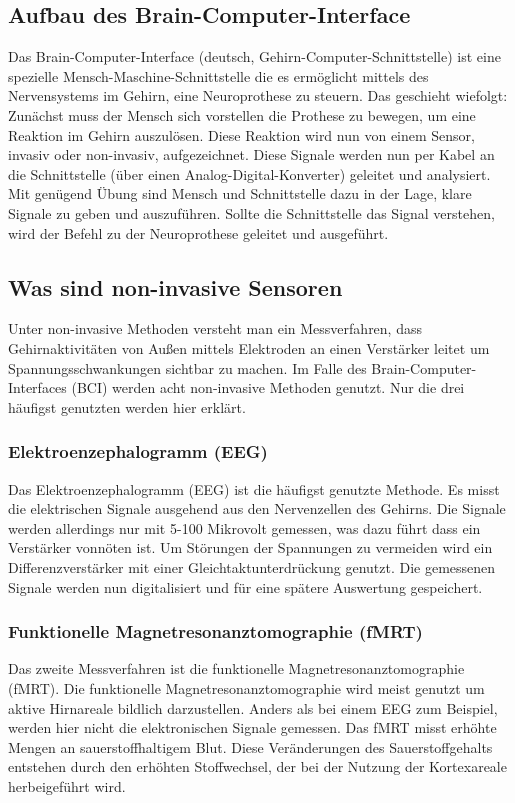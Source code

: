 \documentclass[11pt,ngerman,parskip=half]{scrartcl}
\begin{document}
\subsection{Aufbau des Brain-Computer-Interface} 
Das Brain-Computer-Interface (deutsch, Gehirn-Computer-Schnittstelle) ist
eine spezielle Mensch-Maschine-Schnittstelle die es ermöglicht mittels des
Nervensystems im Gehirn, eine Neuroprothese zu steuern. Das geschieht
wiefolgt: Zunächst muss der Mensch sich vorstellen die Prothese zu bewegen,
um eine Reaktion im Gehirn auszulösen. Diese Reaktion wird nun von einem
Sensor, invasiv oder non-invasiv, aufgezeichnet. Diese Signale werden nun per
Kabel an die Schnittstelle (über einen Analog-Digital-Konverter) geleitet und
analysiert. Mit genügend Übung sind Mensch und Schnittstelle dazu in der
Lage, klare Signale zu geben und auszuführen. Sollte die Schnittstelle das
Signal verstehen, wird der Befehl zu der Neuroprothese geleitet und
ausgeführt.
\parencites{uebersicht}{bciuinvasiv}

\subsection{Was sind non-invasive Sensoren}
Unter non-invasive Methoden versteht man ein Messverfahren, dass
Gehirnaktivitäten von Außen mittels Elektroden an einen Verstärker leitet um
Spannungsschwankungen sichtbar zu machen. Im Falle des
Brain-Computer-Interfaces (BCI) werden acht non-invasive Methoden genutzt.
Nur die drei häufigst genutzten werden hier erklärt.
\parencite{methoden}

\subsubsection{Elektroenzephalogramm (EEG)}
Das Elektroenzephalogramm (EEG) ist die häufigst genutzte Methode. Es misst
die elektrischen Signale ausgehend aus den Nervenzellen des Gehirns. Die
Signale werden allerdings nur mit 5-100 Mikrovolt gemessen, was dazu führt
dass ein Verstärker vonnöten ist. Um Störungen der Spannungen zu vermeiden
wird ein Differenzverstärker mit einer Gleichtaktunterdrückung genutzt. Die
gemessenen Signale werden nun digitalisiert und für eine spätere Auswertung
gespeichert.
\parencite{eegw}

\subsubsection{Funktionelle Magnetresonanztomographie (fMRT)}
Das zweite Messverfahren ist die funktionelle Magnetresonanztomographie
(fMRT). Die funktionelle Magnetresonanztomographie wird meist genutzt um
aktive Hirnareale bildlich darzustellen. Anders als bei einem EEG zum
Beispiel, werden hier nicht die elektronischen Signale gemessen. Das fMRT
misst erhöhte Mengen an sauerstoffhaltigem Blut. Diese Veränderungen des
Sauerstoffgehalts entstehen durch den erhöhten Stoffwechsel, der bei der
Nutzung der Kortexareale herbeigeführt wird.
\parencite{fmrt}
\end{document}
